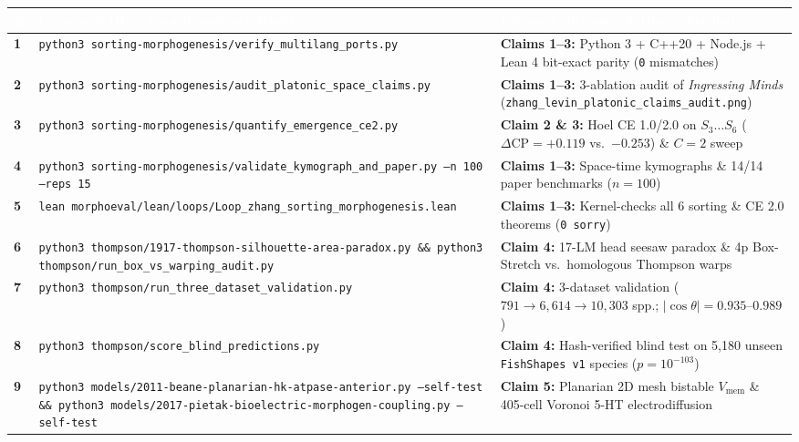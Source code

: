 \documentclass[10pt,a4paper]{article}
\begin{document}
\begin{table}[h!]
\centering
\renewcommand{\arraystretch}{1.14}
\scriptsize
\begin{tabular}{@{}p{}p{}p{}@{}}
\toprule
\rowcolor{navybg}
\textcolor{white}{\textbf{\#}} & \textcolor{white}{\textbf{Command (Run from Repository Root)}} & \textcolor{white}{\textbf{Claims \& Primary Artifacts Verified}} \\
\midrule
\rowcolor{softgray}
\textbf{1} & \texttt{python3 sorting-morphogenesis/verify\_multilang\_ports.py} & \textbf{Claims 1--3:} Python 3 + C++20 + Node.js + Lean 4 bit-exact parity (\texttt{0} mismatches) \\
\textbf{2} & \texttt{python3 sorting-morphogenesis/audit\_platonic\_space\_claims.py} & \textbf{Claims 1--3:} 3-ablation audit of \emph{Ingressing Minds} (\texttt{zhang\_levin\_platonic\_claims\_audit.png}) \\
\rowcolor{softgray}
\textbf{3} & \texttt{python3 sorting-morphogenesis/quantify\_emergence\_ce2.py} & \textbf{Claim 2 \& 3:} Hoel CE 1.0/2.0 on $S_3\dots S_6$ ($\Delta\mathrm{CP}=+0.119$ vs.\ $-0.253$) \& $C=2$ sweep \\
\textbf{4} & \texttt{python3 sorting-morphogenesis/validate\_kymograph\_and\_paper.py --n 100 --reps 15} & \textbf{Claims 1--3:} Space-time kymographs \& 14/14 paper benchmarks ($n=100$) \\
\rowcolor{softgray}
\textbf{5} & \texttt{lean morphoeval/lean/loops/Loop\_zhang\_sorting\_morphogenesis.lean} & \textbf{Claims 1--3:} Kernel-checks all 6 sorting \& CE 2.0 theorems (\texttt{0 sorry}) \\
\textbf{6} & \texttt{python3 thompson/1917-thompson-silhouette-area-paradox.py \&\& python3 thompson/run\_box\_vs\_warping\_audit.py} & \textbf{Claim 4:} 17-LM head seesaw paradox \& 4p Box-Stretch vs.\ homologous Thompson warps \\
\rowcolor{softgray}
\textbf{7} & \texttt{python3 thompson/run\_three\_dataset\_validation.py} & \textbf{Claim 4:} 3-dataset validation ($791 \to 6{,}614 \to 10{,}303$ spp.; $|\cos\theta|=0.935\text{--}0.989$) \\
\textbf{8} & \texttt{python3 thompson/score\_blind\_predictions.py} & \textbf{Claim 4:} Hash-verified blind test on 5,180 unseen \texttt{FishShapes v1} species ($p=10^{-103}$) \\
\rowcolor{softgray}
\textbf{9} & \texttt{python3 models/2011-beane-planarian-hk-atpase-anterior.py --self-test \&\& python3 models/2017-pietak-bioelectric-morphogen-coupling.py --self-test} & \textbf{Claim 5:} Planarian 2D mesh bistable $V_{\mathrm{mem}}$ \& 405-cell Voronoi 5-HT electrodiffusion \\

\end{tabular}
\end{table}
\end{document}

